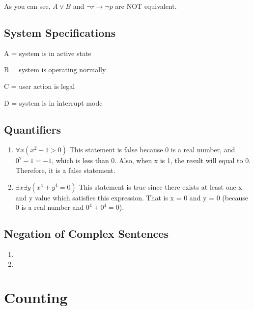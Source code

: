 \documentclass[11pt]{article}
\begin{document}
As you can see, $A\lor B$ and $\neg r \rightarrow \neg p$ are NOT equivalent. 


\subsection{System Specifications}
A = system is in active state 

B = system is operating normally

C = user action is legal 

D = system is in interrupt mode


\subsection{Quantifiers}

\begin{enumerate}[label=(\alph*)]

\item
$\forall x(x^2-1>0)$ This statement is false because 0 is a real number, and $0^2-1=-1$, which is less than 0. Also, when x is 1, the result will equal to 0. Therefore, it is a false statement.

\item
$\exists x \exists y(x^4+y^4=0)$ This statement is true since there exists at least one x and y value which satisfies this expression. That is x = 0 and y = 0 (because 0 is a real number and $0^4+0^4=0$). 

\end{enumerate}


\subsection{Negation of Complex Sentences}

\begin{enumerate}[label=(\alph*)]

\item

\item

\end{enumerate}

\section{Counting}
\end{document}
